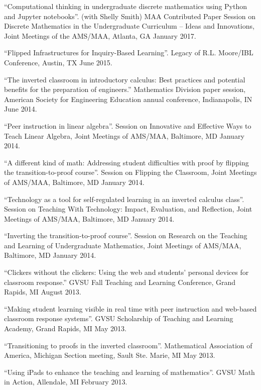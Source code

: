\documentclass[letterpaper]{article}
\renewenvironment{itemize}{
  \begin{list}{}{
    \setlength{\leftmargin}{1.5em}
	\setlength{\itemsep}{0in}
  }
}{
  \end{list}
}
\begin{document}
\begin{itemize}
	\item ``Computational thinking in undergraduate discrete mathematics using Python and Jupyter notebooks''. (with Shelly Smith) MAA Contributed Paper Session on Discrete Mathematics in the Undergraduate Curriculum -- Ideas and Innovations, Joint Meetings of the AMS/MAA, Atlanta, GA January 2017. 
	\item ``Flipped Infrastructures for Inquiry-Based Learning''. Legacy of R.L. Moore/IBL Conference, Austin, TX June 2015.
	\item ``The inverted classroom in introductory calculus: Best practices and potential benefits for the preparation of engineers.'' Mathematics Division paper session, American Society for Engineering Education annual conference, Indianapolis, IN June 2014. 
	\item ``Peer instruction in linear algebra''. Session on Innovative and Effective Ways to Teach Linear Algebra, Joint Meetings of AMS/MAA, Baltimore, MD January 2014. 
	\item ``A different kind of math: Addressing student difficulties with proof by flipping the transition-to-proof course''. Session on Flipping the Classroom, Joint Meetings of AMS/MAA, Baltimore, MD January 2014.
	\item ``Technology as a tool for self-regulated learning in an inverted calculus class''. Session on Teaching With Technology: Impact, Evaluation, and Reflection, Joint Meetings of AMS/MAA, Baltimore, MD January 2014.
	\item ``Inverting the transition-to-proof course''. Session on Research on the Teaching and Learning of Undergraduate Mathematics, Joint Meetings of AMS/MAA, Baltimore, MD January 2014.
	\item ``Clickers without the clickers: Using the web and students' personal devices for classroom response.'' GVSU Fall Teaching and Learning Conference, Grand Rapids, MI August 2013. 
	\item ``Making student learning visible in real time with peer instruction and web-based classroom response systems''. GVSU Scholarship of Teaching and Learning Academy, Grand Rapids, MI May 2013. 
	\item ``Transitioning to proofs in the inverted classroom''. Mathematical Association of America, Michigan Section meeting, Sault Ste. Marie, MI May 2013. 
	\item ``Using iPads to enhance the teaching and learning of mathematics''. GVSU Math in Action, Allendale, MI February 2013. 

\end{itemize}
\end{document}
